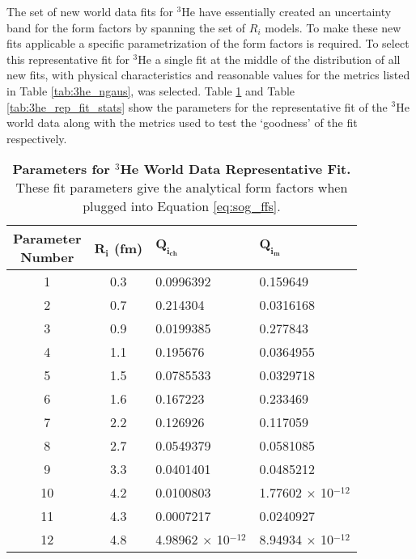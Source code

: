 The set of new world data fits for $^3$He have essentially created an uncertainty band for the form factors by spanning the set of $R_i$ models. To make these new fits applicable a specific parametrization of the form factors is required. To select this representative fit for $^3$He a single fit at the middle of the distribution of all new fits, with physical characteristics and reasonable values for the metrics listed in Table \ref{tab:3he_ngaus}, was selected. Table \ref{tab:3he_rep_fit_pars} and Table \ref{tab:3he_rep_fit_stats} show the parameters for the representative fit of the $^3$He world data along with the metrics used to test the `goodness' of the fit respectively.

\begin{table}[!h]
\centering
\begin{tabular}{|c c l l|}
\hline
\makecell{\textbf{Parameter}\\ \textbf{Number}} & \textbf{$\boldsymbol{R_i}$ (fm)} & \textbf{$\boldsymbol{Q_{i_{ch}}}$} & \textbf{$\boldsymbol{Q_{i_{m}}}$}\\
\hline
1 & 0.3 & 0.0996392 & 0.159649 \\
2 & 0.7 & 0.214304 & 0.0316168 \\
3 & 0.9 & 0.0199385 & 0.277843 \\
4 & 1.1 & 0.195676 & 0.0364955 \\
5 & 1.5 & 0.0785533 & 0.0329718 \\
6 & 1.6 & 0.167223 & 0.233469 \\
7 & 2.2 & 0.126926 & 0.117059 \\
8 & 2.7 & 0.0549379 & 0.0581085 \\
9 & 3.3 & 0.0401401 & 0.0485212 \\
10 & 4.2 & 0.0100803 & 1.77602 $\times$ 10$^{-12}$\\
11 & 4.3 & 0.0007217 & 0.0240927 \\
12 & 4.8 & 4.98962 $\times$ 10$^{-12}$ & 8.94934 $\times$ 10$^{-12}$ \\           
\hline
\end{tabular}
\caption[Parameters for $^3$He World Data Representative Fit]{{\bf{Parameters for $^3$He World Data Representative Fit.}} These fit parameters give the analytical form factors when plugged into Equation \ref{eq:sog_ffs}.}
\label{tab:3he_rep_fit_pars}
\end{table}

